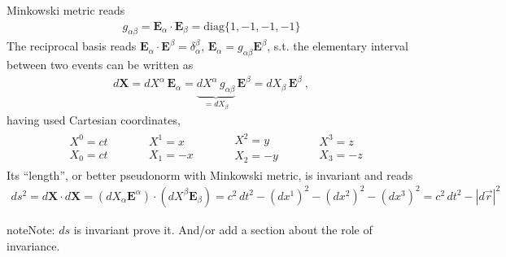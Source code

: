 \documentclass[letterpaper,10pt,english]{jupyterBook}
\begin{document}
\sphinxAtStartPar
Minkowski metric reads
\begin{equation*}
\begin{split}g_{\alpha \beta} = \mathbf{E}_{\alpha} \cdot \mathbf{E}_{\beta} = \text{diag}\{1, -1, -1, -1\}\end{split}
\end{equation*}
\sphinxAtStartPar
The reciprocal basis reads \(\mathbf{E}_{\alpha} \cdot \mathbf{E}^{\beta} = \delta_{\alpha}^{\beta}\), \(\mathbf{E}_{\alpha} = g_{\alpha \beta} \mathbf{E}^{\beta}\), s.t. the elementary interval between two events can be written as
\begin{equation*}
\begin{split}d \mathbf{X} = d X^{\alpha} \, \mathbf{E}_{\alpha} = \underbrace{d X^{\alpha} \, g_{\alpha \beta}}_{= dX_{\beta}} \, \mathbf{E}^{\beta} = d X_{\beta} \, \mathbf{E}^{\beta} \ ,\end{split}
\end{equation*}
\sphinxAtStartPar
having used Cartesian coordinates,
\begin{equation*}
\begin{split}
  \begin{aligned}  & X^0 = c t \\  & X_0 = c t \end{aligned} \qquad
  \begin{aligned}  & X^1 =   x \\  & X_1 =  -x \end{aligned} \qquad
  \begin{aligned}  & X^2 =   y \\  & X_2 =  -y \end{aligned} \qquad
  \begin{aligned}  & X^3 =   z \\  & X_3 =  -z \end{aligned}
\end{split}
\end{equation*}
\sphinxAtStartPar
Its “length”, or better pseudo\sphinxhyphen{}norm with Minkowski metric, is invariant and reads
\begin{equation*}
\begin{split}d s^2 = d \mathbf{X} \cdot d \mathbf{X} = \left( dX_{\alpha} \mathbf{E}^{\alpha} \right) \cdot \left( dX^{\beta} \mathbf{E}_{\beta} \right) = c^2 \, d t^2 - (dx^1)^2 - (dx^2)^2 - (dx^3)^2 = c^2 \, dt^2 - |d \vec{r}|^2 \end{split}
\end{equation*}
\begin{sphinxadmonition}{note}{Note:}
\sphinxAtStartPar
\(ds\) is invariant
 prove it. And/or add a section about the role of invariance.
\end{sphinxadmonition}
\end{document}
